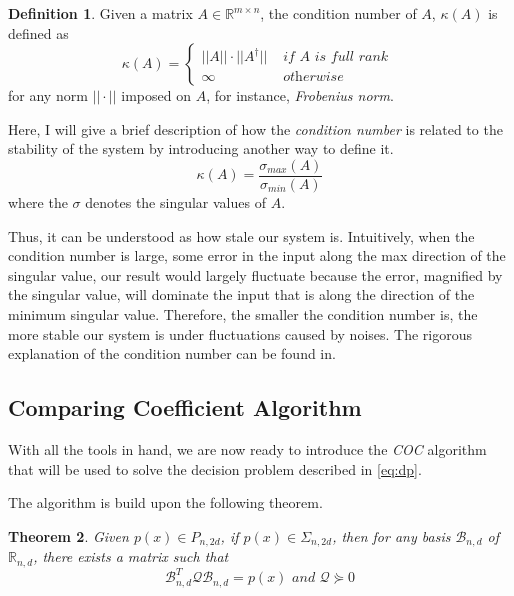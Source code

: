 \documentclass[12pt]{amsart}
\numberwithin{equation}{section}
\newtheorem{thm}{Theorem}
\theoremstyle{definition}
\newtheorem{definition}[thm]{Definition}
\numberwithin{thm}{section}
\begin{document}
\begin{definition}
     \label{def:COND}
     Given a matrix $A \in \mathbb{R}^{m \times n}$, the condition number of $A$, $\kappa(A)$ is defined as
     \begin{equation*}
          \kappa(A) = \begin{cases}
                ||A|| \cdot ||A^\dagger|| & \textit{ if } A \textit{ is full rank } \\
                \infty & \textit{ otherwise }
          \end{cases}
     \end{equation*}
     for any norm $|| \cdot ||$ imposed on $A$, for instance, \emph{Frobenius norm}.
\end{definition}

Here, I will give a brief description of how the \emph{condition number} is related to the stability of the system by introducing another way to define it.
\begin{equation*}
     \kappa(A) = \frac{\sigma_{max} (A)}{\sigma_{min} (A)}
\end{equation*}
where the $\sigma$ denotes the singular values of $A$.

Thus, it can be understood as how stale our system is. 
Intuitively, when the condition number is large, some error in the input along the max direction of the singular value,
our result would largely fluctuate because the error, magnified by the singular value, will dominate the input that is along
the direction of the minimum singular value. 
Therefore, the smaller the condition number is, the more stable our system is under fluctuations caused by noises.
The rigorous explanation of the condition number can be found in. \cite{Cheney:Kincaid}

\subsection{Comparing Coefficient Algorithm}
With all the tools in hand, we are now ready to introduce the \emph{COC} algorithm that will be used to solve the 
decision problem described in \ref*{eq:dp}.

The algorithm is build upon the following theorem.
\begin{thm}
     \label{thm:key}
     Given $p(x) \in P_{n, 2d}$, if $p(x) \in \Sigma_{n, 2d}$, then for any basis $\mathcal{B}_{n, d}$ of $\mathbb{R}_{n, d}$, 
     there exists a matrix such that
     \begin{equation}
          \mathcal{B}_{n, d} ^ T \mathcal{Q} \mathcal{B}_{n, d} = p(x) \textit{ and } \mathcal{Q} \curlyeqsucc 0 \label{eq:2-4}
     \end{equation}
\end{thm}
\end{document}

